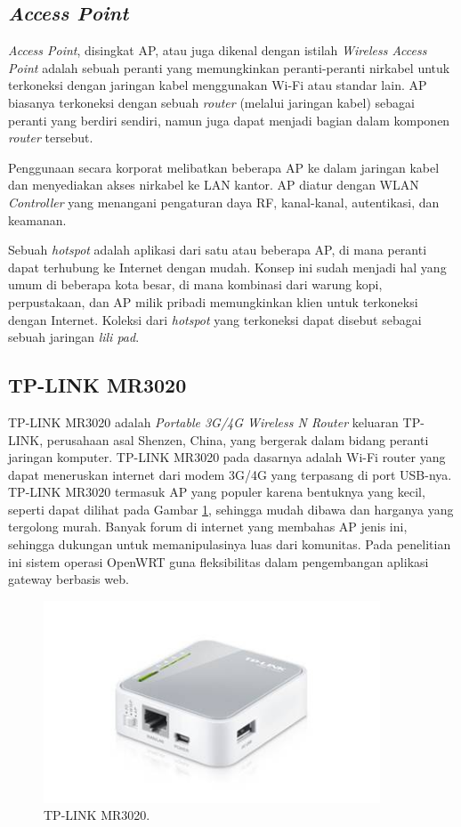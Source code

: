   \subsection{\emph{Access Point}}
    \emph{Access Point}, disingkat AP, atau juga dikenal dengan istilah \emph{Wireless Access Point} adalah sebuah peranti yang memungkinkan peranti-peranti nirkabel untuk terkoneksi dengan jaringan kabel menggunakan Wi-Fi atau standar lain. AP biasanya terkoneksi dengan sebuah \emph{router} (melalui jaringan kabel) sebagai peranti yang berdiri sendiri, namun juga dapat menjadi bagian dalam komponen \emph{router} tersebut.

    Penggunaan secara korporat melibatkan beberapa AP ke dalam jaringan kabel dan menyediakan akses nirkabel ke LAN kantor. AP diatur dengan WLAN \emph{Controller} yang menangani pengaturan daya RF, kanal-kanal, autentikasi, dan keamanan.
    
    Sebuah \emph{hotspot} adalah aplikasi dari satu atau beberapa AP, di mana peranti dapat terhubung ke Internet dengan mudah. Konsep ini sudah menjadi hal yang umum di beberapa kota besar, di mana kombinasi dari warung kopi, perpustakaan, dan AP milik pribadi memungkinkan klien untuk terkoneksi dengan Internet. Koleksi dari \emph{hotspot} yang terkoneksi dapat disebut sebagai sebuah jaringan \emph{lili pad}.

  \subsection{TP-LINK MR3020}
    TP-LINK MR3020 adalah \emph{Portable 3G/4G Wireless N Router} keluaran TP-LINK, perusahaan asal Shenzen, China, yang bergerak dalam bidang peranti jaringan komputer. TP-LINK MR3020 pada dasarnya adalah Wi-Fi router yang dapat meneruskan internet dari modem 3G/4G yang terpasang di port USB-nya. TP-LINK MR3020 termasuk AP yang populer karena bentuknya yang kecil, seperti dapat dilihat pada Gambar \ref{mr3020}, sehingga mudah dibawa dan harganya yang tergolong murah. Banyak forum di internet yang membahas AP jenis ini, sehingga dukungan untuk memanipulasinya luas dari komunitas. Pada penelitian ini sistem operasi OpenWRT guna fleksibilitas dalam pengembangan aplikasi gateway berbasis web.

    \begin{figure}[H]
      \centering
        \includegraphics[width=10cm]{gambar/mr3020}
        \caption{TP-LINK MR3020.}
        \label{mr3020}
    \end{figure}

